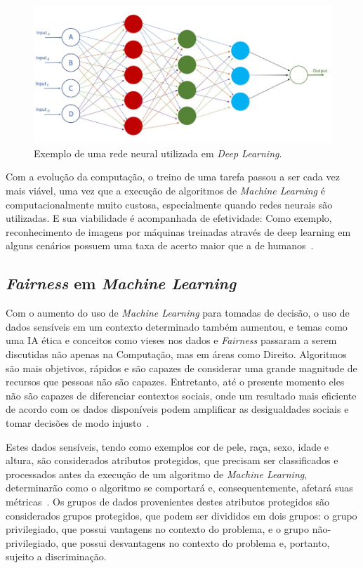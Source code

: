 \documentclass{article}
\begin{document}
\begin{figure}[H]
\centering
\includegraphics[scale=0.8]{images/deep_neural_network.jpg}
\caption {Exemplo de uma rede neural utilizada em \textit{Deep Learning}.}
\label{fig:NeuralNetwork}
\end{figure}

Com a evolução da computação, o treino de uma tarefa passou a ser cada vez mais viável, uma vez que a execução de algoritmos de \textit{Machine Learning} é computacionalmente muito custosa, especialmente quando redes neurais são utilizadas. E sua viabilidade é acompanhada de efetividade: Como exemplo, reconhecimento de imagens por máquinas treinadas através de deep learning em alguns cenários possuem uma taxa de acerto maior que a de humanos~\citep{Copeland_2016}.
\subsection{\textit{Fairness} em \textit{Machine Learning}}

Com o aumento do uso de \textit{Machine Learning} para tomadas de decisão, o uso de dados sensíveis em um contexto determinado também aumentou, e temas como uma IA ética e conceitos como vieses nos dados e \textit{Fairness} passaram a serem discutidas não apenas na Computação, mas em áreas como Direito. Algoritmos são mais objetivos, rápidos e são capazes de considerar uma grande magnitude de recursos que pessoas não são capazes. Entretanto, até o presente momento eles não são capazes de diferenciar contextos sociais, onde um resultado mais eficiente de acordo com os dados disponíveis podem amplificar as desigualdades sociais e tomar decisões de modo injusto~\citep{Mehrabi_2021}. 

Estes dados sensíveis, tendo como exemplos cor de pele, raça, sexo, idade e altura, são considerados atributos protegidos, que precisam ser classificados e processados antes da execução de um algoritmo de \textit{Machine Learning}, determinarão como o algoritmo se comportará e, consequentemente, afetará suas métricas~\citep{Mougan_2022}. Os grupos de dados provenientes destes atributos protegidos são considerados grupos protegidos, que podem ser divididos em dois grupos: o grupo privilegiado, que possui vantagens no contexto do problema, e o grupo não-privilegiado, que possui desvantagens no contexto do problema e, portanto, sujeito a discriminação.
\end{document}
